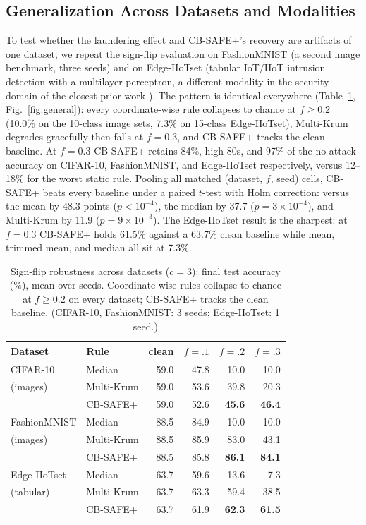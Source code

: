 \documentclass[conference]{IEEEtran}
\begin{document}
\subsection{Generalization Across Datasets and Modalities}\label{sec:general}
To test whether the laundering effect and CB-SAFE+'s recovery are artifacts of one
dataset, we repeat the sign-flip evaluation on FashionMNIST (a second image
benchmark, three seeds) and on Edge-IIoTset (tabular IoT/IIoT intrusion detection
with a multilayer perceptron, a different modality in the security domain of the
closest prior work \cite{byzpqfl2026}). The pattern is identical everywhere
(Table~\ref{tab:general}, Fig.~\ref{fig:general}): every coordinate-wise rule
collapses to chance at $f{\ge}0.2$ (10.0\% on the 10-class image sets, 7.3\% on
15-class Edge-IIoTset), Multi-Krum degrades gracefully then falls at $f{=}0.3$, and
CB-SAFE+ tracks the clean baseline. At $f{=}0.3$ CB-SAFE+ retains 84\%, high-$80$s,
and 97\% of the no-attack accuracy on CIFAR-10, FashionMNIST, and Edge-IIoTset
respectively, versus 12--18\% for the worst static rule. Pooling all matched
(dataset, $f$, seed) cells, CB-SAFE+ beats every baseline under a paired $t$-test
with Holm correction: versus the mean by 48.3 points ($p{<}10^{-4}$), the median by
37.7 ($p{=}3{\times}10^{-4}$), and Multi-Krum by 11.9 ($p{=}9{\times}10^{-3}$). The
Edge-IIoTset result is the sharpest: at $f{=}0.3$ CB-SAFE+ holds 61.5\% against a
63.7\% clean baseline while mean, trimmed mean, and median all sit at 7.3\%.

\begin{table}[t]
\caption{Sign-flip robustness across datasets ($c{=}3$): final test accuracy (\%),
mean over seeds. Coordinate-wise rules collapse to chance at $f{\ge}0.2$ on every
dataset; CB-SAFE+ tracks the clean baseline. (CIFAR-10, FashionMNIST: 3 seeds;
Edge-IIoTset: 1 seed.)}
\label{tab:general}
\centering
\footnotesize
\setlength{\tabcolsep}{3pt}
\begin{tabular}{@{}llrrrr@{}}
\toprule
Dataset & Rule & clean & $f{=}.1$ & $f{=}.2$ & $f{=}.3$\\
\midrule
CIFAR-10 & Median      & 59.0 & 47.8 & 10.0 & 10.0\\
(images) & Multi-Krum  & 59.0 & 53.6 & 39.8 & 20.3\\
         & CB-SAFE+    & 59.0 & 52.6 & \textbf{45.6} & \textbf{46.4}\\
\midrule
FashionMNIST & Median     & 88.5 & 84.9 & 10.0 & 10.0\\
(images)     & Multi-Krum & 88.5 & 85.9 & 83.0 & 43.1\\
             & CB-SAFE+   & 88.5 & 85.8 & \textbf{86.1} & \textbf{84.1}\\
\midrule
Edge-IIoTset & Median     & 63.7 & 59.6 & 13.6 & 7.3\\
(tabular)    & Multi-Krum & 63.7 & 63.3 & 59.4 & 38.5\\
             & CB-SAFE+   & 63.7 & 61.9 & \textbf{62.3} & \textbf{61.5}\\
\bottomrule
\end{tabular}
\end{table}
\end{document}
